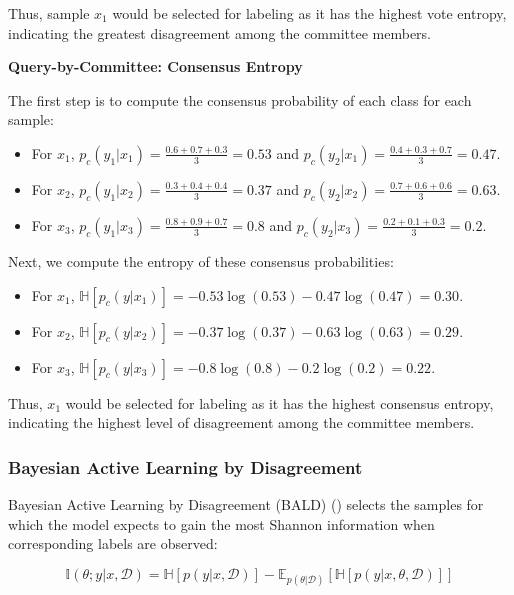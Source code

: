 \documentclass[
  letterpaper,
  numbers=noenddot,
  DIV=11,
  oneside]{scrreprt}
\providecommand{\tightlist}{%
  \setlength{\itemsep}{0pt}\setlength{\parskip}{0pt}}\usepackage{longtable,booktabs,array}
\theoremstyle{remark}
\begin{document}
Thus, sample \(x_1\) would be selected for labeling as it has the
highest vote entropy, indicating the greatest disagreement among the
committee members.

\textbf{Query-by-Committee: Consensus Entropy}

The first step is to compute the consensus probability of each class for
each sample:

\begin{itemize}
\tightlist
\item
  For \(x_1\), \(p_c(y_1|x_1) = \frac{0.6 + 0.7 + 0.3}{3} = 0.53\) and
  \(p_c(y_2|x_1) = \frac{0.4 + 0.3 + 0.7}{3} = 0.47\).
\item
  For \(x_2\), \(p_c(y_1|x_2) = \frac{0.3 + 0.4 + 0.4}{3} = 0.37\) and
  \(p_c(y_2|x_2) = \frac{0.7 + 0.6 + 0.6}{3} = 0.63\).
\item
  For \(x_3\), \(p_c(y_1|x_3) = \frac{0.8 + 0.9 + 0.7}{3} = 0.8\) and
  \(p_c(y_2|x_3) = \frac{0.2 + 0.1 + 0.3}{3} = 0.2\).
\end{itemize}

Next, we compute the entropy of these consensus probabilities:

\begin{itemize}
\tightlist
\item
  For \(x_1\),
  \(\mathbb{H}[p_c(y|x_1)] = -0.53 \log (0.53) - 0.47 \log (0.47) = 0.30\).
\item
  For \(x_2\),
  \(\mathbb{H}[p_c(y|x_2)] = -0.37 \log (0.37) - 0.63 \log (0.63) = 0.29\).
\item
  For \(x_3\),
  \(\mathbb{H}[p_c(y|x_3)] = -0.8 \log (0.8) - 0.2 \log (0.2) = 0.22\).
\end{itemize}

Thus, \(x_1\) would be selected for labeling as it has the highest
consensus entropy, indicating the highest level of disagreement among
the committee members.

\subsubsection{Bayesian Active Learning by
Disagreement}\label{bayesian-active-learning-by-disagreement}

Bayesian Active Learning by Disagreement (BALD)
() selects the samples for
which the model expects to gain the most Shannon information when
corresponding labels are observed:

\[
\mathbb{I}(\theta; y|x, \mathcal{D}) = \mathbb{H}[p(y|x, \mathcal{D})] - \mathbb{E}_{p(\theta | \mathcal{D})} [\mathbb{H}[p(y|x, \theta, \mathcal{D})]]
\]
\end{document}
